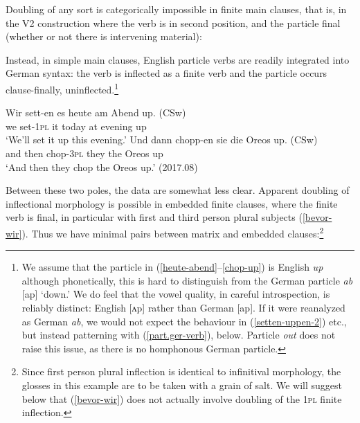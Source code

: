 \documentclass[output=paper]{langscibook}
\begin{document}
Doubling of any sort is categorically impossible in finite main clauses, that is, in the V2 construction where the verb is in second position, and the particle final (whether or not there is intervening material): 

\ea
{}
\z 
\z 

Instead, in simple main clauses, English particle verbs are readily integrated into German syntax: the verb is inflected as a finite verb and the particle occurs clause-finally, uninflected.\footnote{We assume that the particle in (\ref{heute-abend}--\ref{chop-up}) is English \textit{up} although phonetically, this is hard to distinguish from the German particle \textit{ab} {[}ap{]} `down.' We do feel that the vowel quality, in careful introspection, is reliably distinct: English {[}ʌp{]} rather than German {[}ap{]}. If it were reanalyzed as German \textit{ab}, we would not expect the behaviour in (\ref{setten-uppen-2}) etc., but instead patterning with (\ref{part.ger-verb}), below. Particle \textit{out} does not raise this issue, as there is no homphonous German particle.} 

\ea\label{v2-verb-particle}
\ea\label{heute-abend}{\gll Wir sett-en es heute am Abend up. (CSw)\\
we set-\textsc{1pl} it today at evening up\\
\glt `We'll set it up this evening.'}
\ex\label{chop-up}{\gll Und dann chopp-en sie die Oreos up. (CSw)\\
and then chop-\textsc{3pl} they the Oreos up\\
\glt `And then they chop the Oreos up.' (2017.08)}
\z\z 

Between these two poles, the data are somewhat less clear. Apparent doubling of inflectional morphology is possible in embedded finite clauses, where the finite verb is final, in particular with first and third person plural subjects (\ref{bevor-wir}). Thus we have minimal pairs between matrix and embedded clauses:\footnote{Since first person plural inflection is identical to infinitival morphology, the glosses in this example are to be taken with a grain of salt. We will suggest below that (\ref{bevor-wir}) does not actually involve doubling of the \textsc{1pl} finite inflection.}
\end{document}
